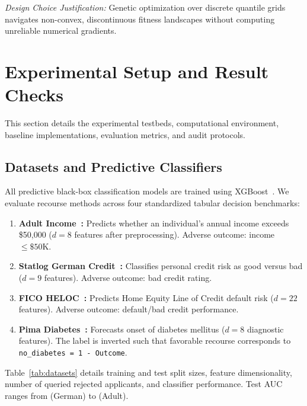 \documentclass[nolineno]{paper/ieee-access/ieeeaccess}%
\newcommand{\artifact}[1]{\nolinkurl{#1}}
\begin{document}
\emph{Design Choice Justification:} Genetic optimization over discrete quantile grids navigates non-convex, discontinuous fitness landscapes without computing unreliable numerical gradients.

\section{Experimental Setup and Result Checks}
\label{sec:protocol}
This section details the experimental testbeds, computational environment, baseline implementations, evaluation metrics, and audit protocols.

\begin{table}[t]
\caption{Saved datasets and prediction scores. ``Queries'' is the number of
rejected test applicants chosen for the action search; $d$ is the number of
input features. Accuracy and area under the ROC curve (AUC) are given as
fractions. The limits of these scores are discussed in
Section~\ref{sec:limitations}.}
\label{tab:datasets}
\centering\small

\end{table}

\subsection{Datasets and Predictive Classifiers}
All predictive black-box classification models are trained using XGBoost~\cite{chen2016xgboost}. We evaluate recourse methods across four standardized tabular decision benchmarks:
\begin{enumerate}
\item \textbf{Adult Income~\cite{kohavi1996adult, dua2019uci}:} Predicts whether an individual's annual income exceeds \$50,000 ($d=8$ features after preprocessing). Adverse outcome: income $\le \$50\mathrm{K}$.
\item \textbf{Statlog German Credit~\cite{dua2019uci}:} Classifies personal credit risk as good versus bad ($d=9$ features). Adverse outcome: bad credit rating.
\item \textbf{FICO HELOC~\cite{fico2018heloc}:} Predicts Home Equity Line of Credit default risk ($d=22$ features). Adverse outcome: default/bad credit performance.
\item \textbf{Pima Diabetes~\cite{smith1988diabetes}:} Forecasts onset of diabetes mellitus ($d=8$ diagnostic features). The label is inverted such that favorable recourse corresponds to \artifact{no_diabetes = 1 - Outcome}.
\end{enumerate}
Table~\ref{tab:datasets} details training and test split sizes, feature dimensionality, number of queried rejected applicants, and classifier performance. Test AUC ranges from \GermanAuc{} (German) to \AdultAuc{} (Adult).
\end{document}
